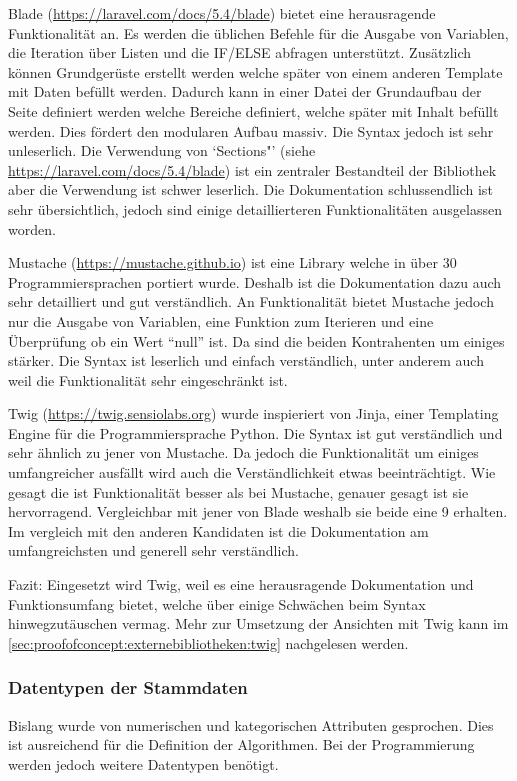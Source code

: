 Blade (\url{https://laravel.com/docs/5.4/blade}) bietet eine herausragende Funktionalität an. Es werden die üblichen Befehle für die Ausgabe von Variablen, die Iteration über Listen und die IF/ELSE abfragen unterstützt. Zusätzlich können Grundgerüste erstellt werden welche später von einem anderen Template mit Daten befüllt werden. Dadurch kann in einer Datei der Grundaufbau der Seite definiert werden welche Bereiche definiert, welche später mit Inhalt befüllt werden. Dies fördert den modularen Aufbau massiv. Die Syntax jedoch ist sehr unleserlich. Die Verwendung von `Sections"' (siehe \url{https://laravel.com/docs/5.4/blade}) ist ein zentraler Bestandteil der Bibliothek aber die Verwendung ist schwer leserlich. Die Dokumentation schlussendlich ist sehr übersichtlich, jedoch sind einige detaillierteren Funktionalitäten ausgelassen worden.

Mustache (\url{https://mustache.github.io}) ist eine Library welche in über 30 Programmiersprachen portiert wurde. Deshalb ist die Dokumentation dazu auch sehr detailliert und gut verständlich. An Funktionalität bietet Mustache jedoch nur die Ausgabe von Variablen, eine Funktion zum Iterieren und eine Überprüfung ob ein Wert "`null"' ist. Da sind die beiden Kontrahenten um einiges stärker. Die Syntax ist leserlich und einfach verständlich, unter anderem auch weil die Funktionalität sehr eingeschränkt ist.

Twig (\url{https://twig.sensiolabs.org}) wurde inspieriert von Jinja, einer Templating Engine für die Programmiersprache Python. Die Syntax ist gut verständlich und sehr ähnlich zu jener von Mustache. Da jedoch die Funktionalität um einiges umfangreicher ausfällt wird auch die Verständlichkeit etwas beeinträchtigt. Wie gesagt die ist Funktionalität besser als bei Mustache, genauer gesagt ist sie hervorragend. Vergleichbar mit jener von Blade weshalb sie beide eine 9 erhalten. Im vergleich mit den anderen Kandidaten ist die Dokumentation am umfangreichsten und generell sehr verständlich.

Fazit: Eingesetzt wird Twig, weil es eine herausragende Dokumentation und Funktionsumfang bietet, welche über einige Schwächen beim Syntax hinwegzutäuschen vermag. Mehr zur Umsetzung der Ansichten mit Twig kann im \cref{sec:proofofconcept:externebibliotheken:twig} nachgelesen werden.

\subsubsection{Datentypen der Stammdaten}
\label{sec:proofofconcept:architektur:anforderungen:datentypen}
Bislang wurde von numerischen und kategorischen Attributen gesprochen. Dies ist ausreichend für die Definition der Algorithmen. Bei der Programmierung werden jedoch weitere Datentypen benötigt.

